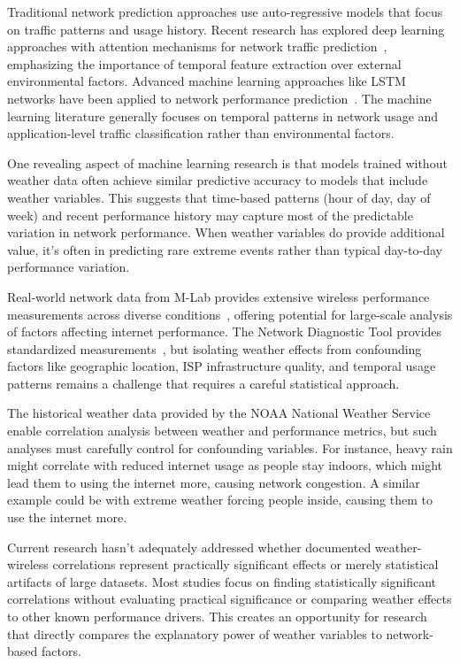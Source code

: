 \documentclass[11pt]{report}
\begin{document}
Traditional network prediction approaches use auto-regressive models that focus on traffic patterns and usage history. Recent research has explored deep learning approaches with attention mechanisms for network traffic prediction~\cite{SU2024104359}, emphasizing the importance of temporal feature extraction over external environmental factors. Advanced machine learning approaches like LSTM networks have been applied to network performance prediction~\cite{nayak2021_5gtraffic}. The machine learning literature generally focuses on temporal patterns in network usage and application-level traffic classification rather than environmental factors.

One revealing aspect of machine learning research is that models trained without weather data often achieve similar predictive accuracy to models that include weather variables. This suggests that time-based patterns (hour of day, day of week) and recent performance history may capture most of the predictable variation in network performance. When weather variables do provide additional value, it's often in predicting rare extreme events rather than typical day-to-day performance variation.

Real-world network data from M-Lab provides extensive wireless performance measurements across diverse conditions~\cite{mlab2025home}, offering potential for large-scale analysis of factors affecting internet performance. The Network Diagnostic Tool provides standardized measurements~\cite{mlab2025ndt}, but isolating weather effects from confounding factors like geographic location, ISP infrastructure quality, and temporal usage patterns remains a challenge that requires a careful statistical approach.

The historical weather data provided by the NOAA National Weather Service~\cite{nws2024timeseries} enable correlation analysis between weather and performance metrics, but such analyses must carefully control for confounding variables. For instance, heavy rain might correlate with reduced internet usage as people stay indoors, which might lead them to using the internet more, causing network congestion. A similar example could be with extreme weather forcing people inside, causing them to use the internet more.

Current research hasn't adequately addressed whether documented weather-wireless correlations represent practically significant effects or merely statistical artifacts of large datasets. Most studies focus on finding statistically significant correlations without evaluating practical significance or comparing weather effects to other known performance drivers. This creates an opportunity for research that directly compares the explanatory power of weather variables to network-based factors.
\end{document}
